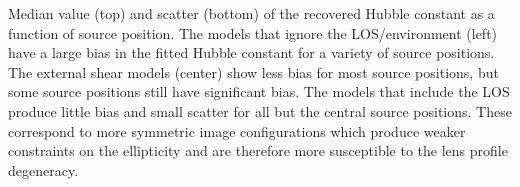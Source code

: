\label{fig:srcpos} Median value (top) and scatter (bottom) of the recovered Hubble constant as a function of source position. The models that ignore the LOS/environment (left) have a large bias in the fitted Hubble constant for a variety of source positions. The external shear models (center) show less bias for most source positions, but some source positions still have significant bias. The models that include the LOS produce little bias and small scatter for all but the central source positions. These correspond to more symmetric image configurations which produce weaker constraints on the ellipticity and are therefore more susceptible to the lens profile degeneracy.
